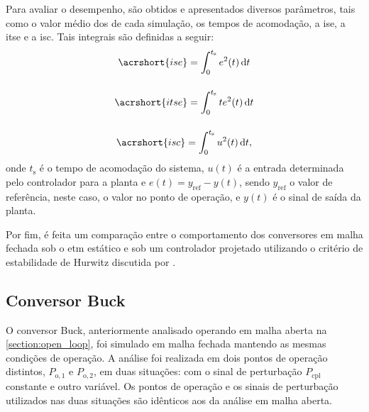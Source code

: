 Para avaliar o desempenho, são obtidos e apresentados diversos parâmetros, tais como o valor médio dos  de cada simulação, os tempos de acomodação, a \acrfull{ise}, a \acrfull{itse} e a \acrfull{isc}. Tais integrais são definidas a seguir: \begin{gather}
  \acrshort{ise} = \int_0^{t_\mathrm{s}} e^2(t) \, \mathrm{d}t \\[12pt]
  \acrshort{itse} = \int_0^{t_\mathrm{s}} t e^2(t) \, \mathrm{d}t \\[12pt]
  \acrshort{isc} = \int_0^{t_\mathrm{s}} u^2(t) \, \mathrm{d}t,
\end{gather} onde $t_{\mathrm{s}}$ é o tempo de acomodação do sistema, $u(t)$ é a entrada determinada pelo controlador para a planta e $e(t) = y_{\mathrm{ref}} - y(t)$, sendo $y_{\mathrm{ref}}$ o valor de referência, neste caso, o valor no ponto de operação, e $y(t)$ é o sinal de saída da planta.

Por fim, é feita um comparação entre o comportamento dos conversores em malha fechada sob o \acrshort{etm} estático e sob um controlador projetado utilizando o critério de estabilidade de Hurwitz discutida por \cite{Duan2013}.


\subsection{Conversor Buck}

O conversor Buck, anteriormente analisado operando em malha aberta na \autoref{section:open_loop}, foi simulado em malha fechada mantendo as mesmas condições de operação. A análise foi realizada em dois pontos de operação distintos, $P_{\mathrm{o}, 1}$ e $P_{\mathrm{o}, 2}$, em duas situações: com o sinal de perturbação $P_{\mathrm{cpl}}$ constante e outro variável. Os pontos de operação e os sinais de perturbação utilizados nas duas situações são idênticos aos da análise em malha aberta.

